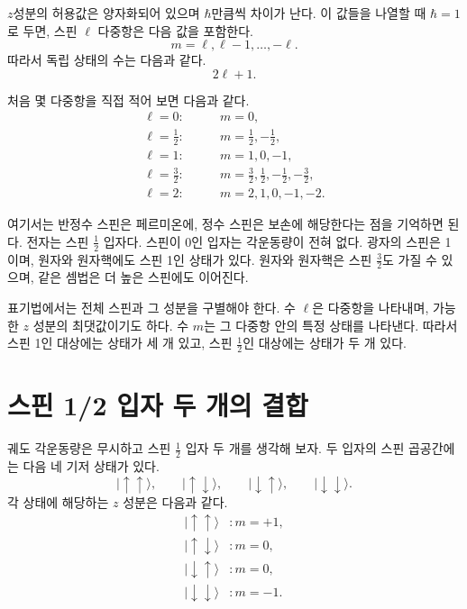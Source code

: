 \(z\)성분의 허용값은 양자화되어 있으며 \(\hbar\)만큼씩 차이가 난다. 이 값들을 나열할 때 \(\hbar=1\)로 두면, 스핀 \(\ell\) 다중항은 다음 값을 포함한다.
\begin{equation}
m=\ell,\ell-1,\ldots,-\ell.
\end{equation}
따라서 독립 상태의 수는 다음과 같다.
\begin{equation}
2\ell+1.
\end{equation}

처음 몇 다중항을 직접 적어 보면 다음과 같다.
\begin{align}
\ell=0:&\qquad m=0,\\
\ell=\frac12:&\qquad m=\frac12,-\frac12,\\
\ell=1:&\qquad m=1,0,-1,\\
\ell=\frac32:&\qquad
m=\frac32,\frac12,-\frac12,-\frac32,\\
\ell=2:&\qquad m=2,1,0,-1,-2.
\end{align}

여기서는 반정수 스핀은 페르미온에, 정수 스핀은 보손에 해당한다는 점을 기억하면 된다. 전자는 스핀 \(\tfrac12\) 입자다. 스핀이 0인 입자는 각운동량이 전혀 없다. 광자의 스핀은 1이며, 원자와 원자핵에도 스핀 1인 상태가 있다. 원자와 원자핵은 스핀 \(\tfrac32\)도 가질 수 있으며, 같은 셈법은 더 높은 스핀에도 이어진다.

표기법에서는 전체 스핀과 그 성분을 구별해야 한다. 수 \(\ell\)은 다중항을 나타내며, 가능한 \(z\) 성분의 최댓값이기도 하다. 수 \(m\)는 그 다중항 안의 특정 상태를 나타낸다. 따라서 스핀 1인 대상에는 상태가 세 개 있고, 스핀 \(\tfrac12\)인 대상에는 상태가 두 개 있다.

\section{스핀 1/2 입자 두 개의 결합}

궤도 각운동량은 무시하고 스핀 \(\tfrac12\) 입자 두 개를 생각해 보자. 두 입자의 스핀 곱공간에는 다음 네 기저 상태가 있다.
\begin{equation}
|\uparrow\uparrow\rangle,\qquad
|\uparrow\downarrow\rangle,\qquad
|\downarrow\uparrow\rangle,\qquad
|\downarrow\downarrow\rangle.
\end{equation}
각 상태에 해당하는 \(z\) 성분은 다음과 같다.
\begin{align}
|\uparrow\uparrow\rangle &: m=+1,\\
|\uparrow\downarrow\rangle &: m=0,\\
|\downarrow\uparrow\rangle &: m=0,\\
|\downarrow\downarrow\rangle &: m=-1.
\end{align}

